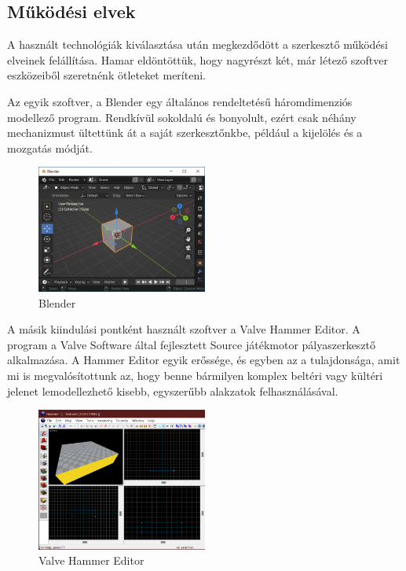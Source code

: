 \subsection{Működési elvek}

A használt technológiák kiválasztása után megkezdődött a szerkesztő működési elveinek felállítása.
Hamar eldöntöttük, hogy nagyrészt két, már létező szoftver eszközeiből szeretnénk ötleteket
meríteni.

Az egyik szoftver, a Blender egy általános rendeltetésű
háromdimenziós modellező program. Rendkívül sokoldalú és bonyolult, ezért csak néhány mechanizmust
ültettünk át a saját szerkesztőnkbe, például a kijelölés és a mozgatás módját.

\begin{figure}[h]
      \centering
      \includegraphics[width=0.5\textwidth]{parts/developer-documentation/editor/images/blender.png}
      \caption{Blender}
\end{figure}

A másik kiindulási pontként használt szoftver a Valve Hammer Editor. A
program a Valve Software által fejlesztett Source játékmotor pályaszerkesztő alkalmazása. A Hammer
Editor egyik erőssége, és egyben az a tulajdonsága, amit mi is megvalósítottunk az, hogy benne
bármilyen komplex beltéri vagy kültéri jelenet lemodellezhető kisebb, egyszerűbb alakzatok
felhasználásával.

\begin{figure}[h]
      \centering
      \includegraphics[width=0.5\textwidth]{parts/developer-documentation/editor/images/hammer.png}
      \caption{Valve Hammer Editor}
\end{figure}



